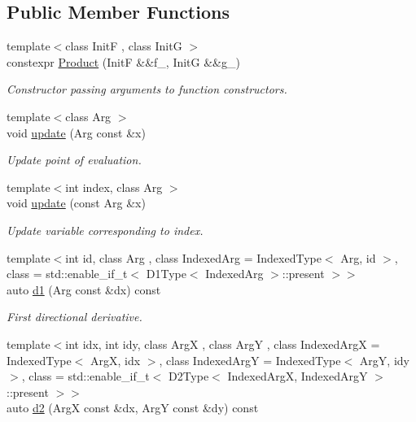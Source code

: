 \subsection*{Public Member Functions}
\begin{DoxyCompactItemize}
\item 
{\footnotesize template$<$class InitF , class InitG $>$ }\\constexpr \hyperlink{structFunG_1_1MathematicalOperations_1_1Product_aa8cfd39987b88daf172a42cc7a273535}{Product} (InitF \&\&f\+\_\+, InitG \&\&g\+\_\+)
\begin{DoxyCompactList}\small\item\em Constructor passing arguments to function constructors. \end{DoxyCompactList}\item 
{\footnotesize template$<$class Arg $>$ }\\void \hyperlink{structFunG_1_1MathematicalOperations_1_1Product_a5b45c1bac06651ee5b6ea79fb5128ef9}{update} (Arg const \&x)
\begin{DoxyCompactList}\small\item\em Update point of evaluation. \end{DoxyCompactList}\item 
{\footnotesize template$<$int index, class Arg $>$ }\\void \hyperlink{structFunG_1_1MathematicalOperations_1_1Product_a8db3d935bbe273c0436ff3bc6bb6b786}{update} (const Arg \&x)
\begin{DoxyCompactList}\small\item\em Update variable corresponding to index. \end{DoxyCompactList}\item 
{\footnotesize template$<$int id, class Arg , class Indexed\+Arg  = Indexed\+Type$<$ Arg, id $>$, class  = std\+::enable\+\_\+if\+\_\+t$<$ D1\+Type$<$ Indexed\+Arg $>$\+::present $>$$>$ }\\auto \hyperlink{structFunG_1_1MathematicalOperations_1_1Product_aea69feaac16f79717a85d7b089a80f8f}{d1} (Arg const \&dx) const 
\begin{DoxyCompactList}\small\item\em First directional derivative. \end{DoxyCompactList}\item 
{\footnotesize template$<$int idx, int idy, class ArgX , class ArgY , class Indexed\+ArgX  = Indexed\+Type$<$ Arg\+X, idx $>$, class Indexed\+ArgY  = Indexed\+Type$<$ Arg\+Y, idy $>$, class  = std\+::enable\+\_\+if\+\_\+t$<$ D2\+Type$<$ Indexed\+Arg\+X, Indexed\+Arg\+Y $>$\+::present $>$$>$ }\\auto \hyperlink{structFunG_1_1MathematicalOperations_1_1Product_a91802ff95963324b5f36016ac5f8c5e0}{d2} (ArgX const \&dx, ArgY const \&dy) const 

\end{DoxyCompactItemize}

